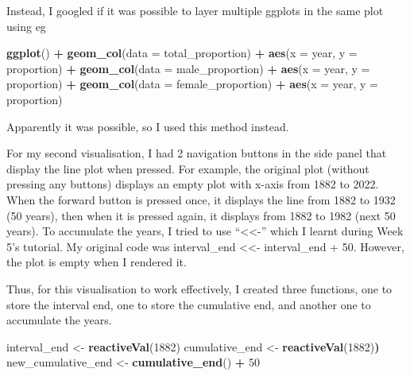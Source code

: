 \documentclass[
]{article}
\newenvironment{Shaded}{\begin{snugshade}}{\end{snugshade}}
\newcommand{\AttributeTok}[1]{\textcolor[rgb]{0.13,0.29,0.53}{#1}}
\newcommand{\DecValTok}[1]{\textcolor[rgb]{0.00,0.00,0.81}{#1}}
\newcommand{\ErrorTok}[1]{\textcolor[rgb]{0.64,0.00,0.00}{\textbf{#1}}}
\newcommand{\FunctionTok}[1]{\textcolor[rgb]{0.13,0.29,0.53}{\textbf{#1}}}
\newcommand{\NormalTok}[1]{#1}
\newcommand{\OtherTok}[1]{\textcolor[rgb]{0.56,0.35,0.01}{#1}}
\newcommand{\SpecialCharTok}[1]{\textcolor[rgb]{0.81,0.36,0.00}{\textbf{#1}}}
\begin{document}
Instead, I googled if it was possible to layer multiple ggplots in the
same plot using eg

\begin{Shaded}
\begin{Highlighting}[]
\FunctionTok{ggplot}\NormalTok{() }\SpecialCharTok{+} 
\FunctionTok{geom\_col}\NormalTok{(}\AttributeTok{data =}\NormalTok{ total\_proportion) }\SpecialCharTok{+} \FunctionTok{aes}\NormalTok{(}\AttributeTok{x =}\NormalTok{ year, }\AttributeTok{y =}\NormalTok{ proportion) }\SpecialCharTok{+} 
\FunctionTok{geom\_col}\NormalTok{(}\AttributeTok{data =}\NormalTok{ male\_proportion) }\SpecialCharTok{+} \FunctionTok{aes}\NormalTok{(}\AttributeTok{x =}\NormalTok{ year, }\AttributeTok{y =}\NormalTok{ proportion) }\SpecialCharTok{+} 
\FunctionTok{geom\_col}\NormalTok{(}\AttributeTok{data =}\NormalTok{ female\_proportion) }\SpecialCharTok{+} \FunctionTok{aes}\NormalTok{(}\AttributeTok{x =}\NormalTok{ year, }\AttributeTok{y =}\NormalTok{ proportion)}
\end{Highlighting}
\end{Shaded}

Apparently it was possible, so I used this method instead.

For my second visualisation, I had 2 navigation buttons in the side
panel that display the line plot when pressed. For example, the original
plot (without pressing any buttons) displays an empty plot with x-axis
from 1882 to 2022. When the forward button is pressed once, it displays
the line from 1882 to 1932 (50 years), then when it is pressed again, it
displays from 1882 to 1982 (next 50 years). To accumulate the years, I
tried to use ``\textless\textless-'' which I learnt during Week 5's
tutorial. My original code was interval\_end \textless\textless-
interval\_end + 50. However, the plot is empty when I rendered it.

Thus, for this visualisation to work effectively, I created three
functions, one to store the interval end, one to store the cumulative
end, and another one to accumulate the years.

\begin{Shaded}
\begin{Highlighting}[]
\NormalTok{interval\_end }\OtherTok{\textless{}{-}} \FunctionTok{reactiveVal}\NormalTok{(}\DecValTok{1882}\NormalTok{)}
\NormalTok{cumulative\_end }\OtherTok{\textless{}{-}} \FunctionTok{reactiveVal}\NormalTok{(}\DecValTok{1882}\NormalTok{)}\ErrorTok{)}
\NormalTok{new\_cumulative\_end }\OtherTok{\textless{}{-}} \FunctionTok{cumulative\_end}\NormalTok{() }\SpecialCharTok{+} \DecValTok{50}
\end{Highlighting}
\end{Shaded}
\end{document}
